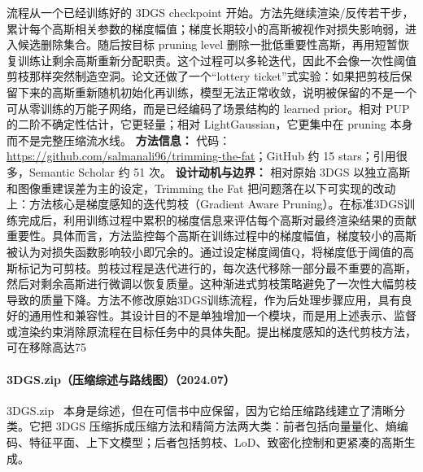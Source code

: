 流程从一个已经训练好的 3DGS checkpoint 开始。方法先继续渲染/反传若干步，累计每个高斯相关参数的梯度幅值；梯度长期较小的高斯被视作对损失影响弱，进入候选删除集合。随后按目标 pruning level 删除一批低重要性高斯，再用短暂恢复训练让剩余高斯重新分配职责。这个过程可以多轮迭代，因此不会像一次性阈值剪枝那样突然制造空洞。论文还做了一个“lottery ticket”式实验：如果把剪枝后保留下来的高斯重新随机初始化再训练，模型无法正常收敛，说明被保留的不是一个可从零训练的万能子网络，而是已经编码了场景结构的 learned prior。相对 PUP 的二阶不确定性估计，它更轻量；相对 LightGaussian，它更集中在 pruning 本身而不是完整压缩流水线。
\textbf{方法信息：} 代码：\url{https://github.com/salmanali96/trimming-the-fat}；GitHub 约 15 stars；引用很多，Semantic Scholar 约 51 次。
\textbf{设计动机与边界：} 相对原始 3DGS 以独立高斯和图像重建误差为主的设定，Trimming the Fat 把问题落在以下可实现的改动上：方法核心是梯度感知的迭代剪枝（Gradient Aware Pruning）。在标准3DGS训练完成后，利用训练过程中累积的梯度信息来评估每个高斯对最终渲染结果的贡献重要性。具体而言，方法监控每个高斯在训练过程中的梯度幅值，梯度较小的高斯被认为对损失函数影响较小即冗余的。通过设定梯度阈值Q，将梯度低于阈值的高斯标记为可剪枝。剪枝过程是迭代进行的，每次迭代移除一部分最不重要的高斯，然后对剩余高斯进行微调以恢复质量。这种渐进式剪枝策略避免了一次性大幅剪枝导致的质量下降。方法不修改原始3DGS训练流程，作为后处理步骤应用，具有良好的通用性和兼容性。其设计目的不是单独增加一个模块，而是用上述表示、监督或渲染约束消除原流程在目标任务中的具体失配。提出梯度感知的迭代剪枝方法，可在移除高达75%
\paragraph{3DGS.zip（压缩综述与路线图）（2024.07）}
3DGS.zip~\cite{2407_09510} 本身是综述，但在可信书中应保留，因为它给压缩路线建立了清晰分类。它把 3DGS 压缩拆成压缩方法和精简方法两大类：前者包括向量量化、熵编码、特征平面、上下文模型；后者包括剪枝、LoD、致密化控制和更紧凑的高斯生成。

